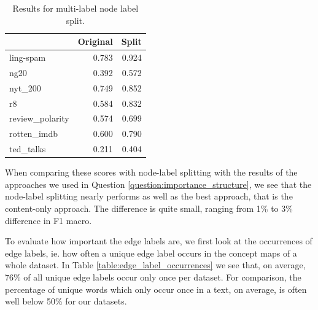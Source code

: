 \begin{table}[htb!]
	\centering
\begin{tabular}{lrr}
	{} &  Original &  Split \\
	\midrule
	ling-spam       & 0.783 & 0.924 \\
	ng20            & 0.392 & 0.572 \\
	nyt\_200         & 0.749 & 0.852 \\
	r8              & 0.584 & 0.832 \\
	review\_polarity & 0.574 & 0.699 \\
	rotten\_imdb     & 0.600 & 0.790 \\
	ted\_talks       & 0.211 & 0.404 \\
	\bottomrule
\end{tabular}
\caption[Results: Multi-label split]{Results for multi-label node label split.}\label{table:results_multi_label_split}
\end{table}

When comparing these scores with node-label splitting with the results of the approaches we used in Question \ref{question:importance_structure}, we see that the node-label splitting nearly performs as well as the best approach, that is the content-only approach.
The difference is quite small, ranging from 1\% to 3\% difference in F1 macro.


To evaluate how important the edge labels are, we first look at the occurrences of edge labels, ie. how often a unique edge label occurs in the concept maps of a whole dataset.
In Table \ref{table:edge_label_occurrences} we see that, on average, 76\% of all unique edge labels occur only once per dataset. For comparison, the percentage of unique words which only occur once in a text, on average, is often well below 50\% for our datasets.

